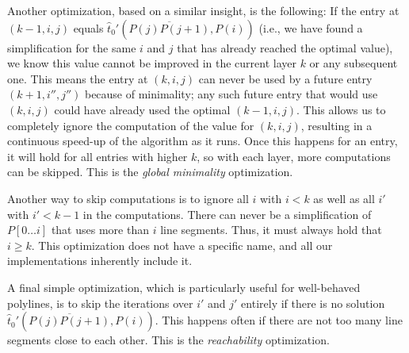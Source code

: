 Another optimization, based on a similar insight, is the following: If the entry at \((k-1, i, j)\) equals \(\hat t_0'(\overline{P(j)P(j+1)}, P(i))\) (i.e., we have found a simplification for the same \(i\) and \(j\) that has already reached the optimal value), we know this value cannot be improved in the current layer \(k\) or any subsequent one. This means the entry at \((k, i, j)\) can never be used by a future entry \((k + 1, i'', j'')\) because of minimality; any such future entry that would use \((k, i, j)\) could have already used the optimal \((k-1, i, j)\). This allows us to completely ignore the computation of the value for \((k, i, j)\), resulting in a continuous speed-up of the algorithm as it runs. Once this happens for an entry, it will hold for all entries with higher \(k\), so with each layer, more computations can be skipped. This is the \emph{global minimality} optimization.

Another way to skip computations is to ignore all \(i\) with \(i < k\) as well as all \(i'\) with \(i' < k - 1\) in the computations. There can never be a simplification of \(P[0\dots i]\) that uses more than \(i\) line segments. Thus, it must always hold that \(i \geq k\). This optimization does not have a specific name, and all our implementations inherently include it.

A final simple optimization, which is particularly useful for well-behaved polylines, is to skip the iterations over \(i'\) and \(j'\) entirely if there is no solution \(\hat t_0'(\overline{P(j)P(j+1)}, P(i))\). This happens often if there are not too many line segments close to each other. This is the \emph{reachability} optimization.
